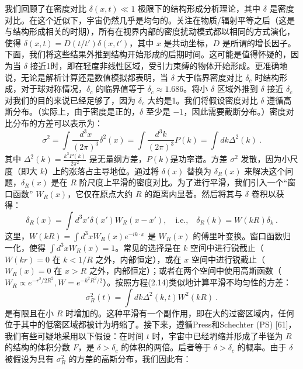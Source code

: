我们回顾了在密度对比 \( \delta(x, t) \ll 1 \) 极限下的结构形成分析理论，其中 \( \delta \) 是密度对比。在这个近似下，宇宙仍然几乎是均匀的。关注在物质/辐射平等之后（这是与结构形成相关的时期），所有在视界内部的密度扰动模式都以相同的方式演化，使得 \( \delta(x, t) = D(t/t')\delta(x, t') \)，其中 \( x \) 是共动坐标，\( D \) 是所谓的增长因子。下面，我们将这些结果外推到结构开始形成的后期时间。这可能是值得怀疑的，因为当 \( \delta \) 接近1时，即在轻度非线性区域，受引力束缚的物体开始形成。更准确地说，无论是解析计算还是数值模拟都表明，当 \( \delta \) 大于临界密度对比 \( \delta_c \) 时结构形成，对于球对称情况，\( \delta_c \) 的临界值等于 \( \delta_c \approx 1.686 \)。将小 \( \delta \) 区域外推到 \( \delta \) 接近 \( \delta_c \) 对我们的目的来说已经足够了，因为 \( \delta_c \) 大约是1。我们将假设密度对比 \( \delta \) 遵循高斯分布。（实际上，由于密度是正的，\( \delta \) 至少是 \( -1 \)，因此需要截断分布。）密度对比分布的方差可以表示为：
\begin{equation}
\sigma^2 = \int \frac{d^3x}{(2\pi)^3} \delta^2(x) = \int \frac{d^3k}{(2\pi)^3} P(k) = \int dk \Delta^2(k)~.
\end{equation}
其中 \( \Delta^2(k) = \frac{k^3 P(k)}{2\pi^2} \) 是无量纲方差，\( P(k) \)是功率谱。方差 \( \sigma^2 \) 发散，因为小尺度（即大 \( k \)）上的涨落占主导地位。通过将 \( \delta(x) \) 替换为 \( \delta_R(x) \) 来解决这个问题，\( \delta_R(x) \) 是在 \( R \) 阶尺度上平滑的密度对比。为了进行平滑，我们引入一个“窗口函数” \( W_R(x) \)，它仅在原点大约 \( R \) 的距离内显著。然后将其与 \( \delta \) 卷积以获得：
\begin{equation}
\delta_R(x) = \int d^3x' \delta(x') W_R(x - x'), \quad \text{i.e.,} \quad \delta_R(k) = W(kR) \delta_k~. 
\end{equation}
这里，\( W(kR) = \int d^3x W_R(x) e^{-ik \cdot x} \) 是 \( W_R(x) \) 的傅里叶变换。窗口函数归一化，使得 \( \int d^3x W_R(x) = 1 \)。常见的选择是在 \( k \) 空间中进行锐截止（\( W(kr) = 0 \) 在 \( k < 1/R \) 之外，内部恒定），或在 \( x \) 空间中进行锐截止（\( W_R(x) = 0 \) 在 \( x > R \) 之外，内部恒定）；或者在两个空间中使用高斯函数（\( W_R \propto e^{-r^2/2R^2}, W = e^{-k^2R^2/2} \)）。按照方程(2.14)类似地计算平滑不均匀性的方差：
\begin{equation}
\sigma_R^2(t) = \int dk \Delta^2(k, t) W^2(kR)~.
\end{equation}
是有限且在小 \( R \) 时增加的。这种平滑有一个副作用，即在大的过密区域内，任何位于其中的低密区域都被计为坍缩了。接下来，遵循Press和Schechter (PS) [61]，我们有些可疑地采用以下假设：在时间 \( t \) 时，宇宙中已经坍缩并形成了半径为 \( R \) 的结构的体积分数 \( F \)，是 \( \delta > \delta_c \) 的体积的两倍。后者等于 \( \delta > \delta_c \) 的概率。由于 \( \delta \) 被假设为具有 \( \sigma_R^2 \) 的方差的高斯分布，我们因此有：
